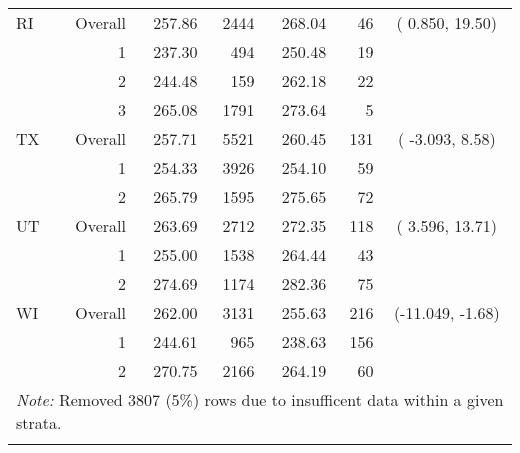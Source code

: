 \begin{longtable}{lrrr@{\extracolsep{.25cm}}rrc}
   \hline
RI & Overall & 257.86 & 2444 & 268.04 &  46 & (  0.850, 19.50) \\ 
   & 1 & 237.30 & 494 & 250.48 &  19 &  \\ 
   & 2 & 244.48 & 159 & 262.18 &  22 &  \\ 
   & 3 & 265.08 & 1791 & 273.64 &   5 &  \\ 
   \hline
TX & Overall & 257.71 & 5521 & 260.45 & 131 & ( -3.093,  8.58) \\ 
   & 1 & 254.33 & 3926 & 254.10 &  59 &  \\ 
   & 2 & 265.79 & 1595 & 275.65 &  72 &  \\ 
   \hline
UT & Overall & 263.69 & 2712 & 272.35 & 118 & (  3.596, 13.71) \\ 
   & 1 & 255.00 & 1538 & 264.44 &  43 &  \\ 
   & 2 & 274.69 & 1174 & 282.36 &  75 &  \\ 
   \hline
WI & Overall & 262.00 & 3131 & 255.63 & 216 & (-11.049, -1.68) \\ 
   & 1 & 244.61 & 965 & 238.63 & 156 &  \\ 
   & 2 & 270.75 & 2166 & 264.19 &  60 &  \\ 
   \hline \multicolumn{7}{l}{\textit{Note:} Removed 3807 (5\%) rows due to insufficent data within a given strata.} \\\hline
\label{g8read-mlpsa-ctree}
\end{longtable}
